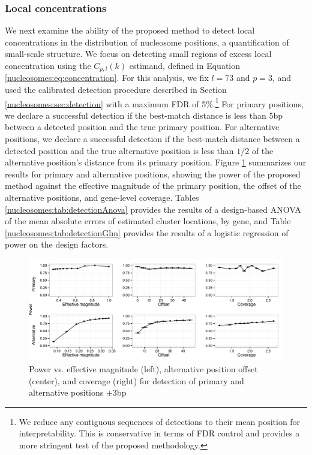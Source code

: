 \subsubsection{Local concentrations}
\label{nucleosomes:sec:localPower}

We next examine the ability of the proposed method to detect local concentrations in the distribution of nucleosome positions, a quantification of small-scale structure.
We focus on detecting small regions of excess local concentration using the $C_{p,l}(k)$ estimand, defined in Equation \ref{nucleosomes:eq:concentration}.
For this analysis, we fix $l = 73$ and $p = 3$, and used the calibrated detection procedure described in Section \ref{nucleosomes:sec:detection} with a maximum FDR of 5\%.\footnote{We reduce any contiguous sequences of detections to their mean position for interpretability. This is conservative in terms of FDR control and provides a more stringent test of the proposed methodology.}
%
For primary positions, we declare a successful detection if the best-match distance is less than 5bp between a detected position and the true primary position.
For alternative positions, we declare a successful detection if the best-match distance between a detected position and the true alternative position is less than $1/2$ of the alternative position's distance from its primary position.
%
Figure \ref{nucleosomes:fig:powerLocal} summarizes our results for primary and alternative positions, showing the power of the proposed method against the effective magnitude of the primary position, the offset of the alternative positions, and gene-level coverage.
Tables \ref{nucleosomes:tab:detectionAnova} provides the results of a design-based ANOVA of the mean absolute errors of  estimated cluster locations, by gene, and Table \ref{nucleosomes:tab:detectionGlm} provides the results of a logistic regression of power on the design factors.
%
\ifx\nofigures\undefined
\begin{figure}
\centering
\includegraphics[width=\textwidth]{figures/nucleosomes/figure_power_combined-pm3_3-panel}
\caption{Power vs. effective magnitude (left), alternative position offset (center), and coverage (right) for detection of primary and alternative positions $\pm 3$bp \label{nucleosomes:fig:powerLocal}}
\end{figure}

